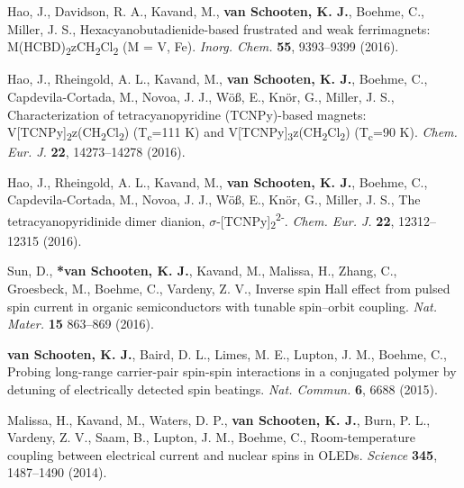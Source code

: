 \documentclass[11pt,letterpaper]{article}
\begin{document}
\begin{bibenum}
	\item Hao, J., Davidson, R. A., Kavand, M., \textbf{van Schooten, K. J.}, Boehme, C., Miller, J. S., Hexacyanobutadienide-based frustrated and weak ferrimagnets: M(HCBD)\textsubscript{2}\textbullet zCH\textsubscript{2}Cl\textsubscript{2} (M = V, Fe). \textit{Inorg. Chem.} \textbf{55}, 9393--9399 (2016). 

	\item Hao, J., Rheingold, A. L., Kavand, M., \textbf{van Schooten, K. J.}, Boehme, C., Capdevila-Cortada, M., Novoa, J. J., W\"o\ss{}, E., Kn\"or, G., Miller, J. S., Characterization of tetracyanopyridine (TCNPy)-based magnets: V[TCNPy]\textsubscript{2}\textbullet z(CH\textsubscript{2}Cl\textsubscript{2}) (T\textsubscript{c}=111 K) and V[TCNPy]\textsubscript{3}\textbullet z(CH\textsubscript{2}Cl\textsubscript{2}) (T\textsubscript{c}=90 K). \textit{Chem. Eur. J.} \textbf{22}, 14273--14278 (2016). 

	\item Hao, J., Rheingold, A. L., Kavand, M., \textbf{van Schooten, K. J.}, Boehme, C., Capdevila-Cortada, M., Novoa, J. J., W\"o\ss{}, E., Kn\"or, G., Miller, J. S., The tetracyanopyridinide dimer dianion, $\sigma$-[TCNPy]\textsubscript{2}\textsuperscript{2-}. \textit{Chem. Eur. J.} \textbf{22}, 12312--12315 (2016). 

	\item *Sun, D., \textbf{*van Schooten, K. J.}, Kavand, M., Malissa, H., Zhang, C., Groesbeck, M., Boehme, C., Vardeny, Z. V., Inverse spin Hall effect from pulsed spin current in organic semiconductors with tunable spin–orbit coupling. \textit{Nat. Mater.} \textbf{15} 863--869 (2016).  

	\item \textbf{van Schooten, K. J.}, Baird, D. L., Limes, M. E., Lupton, J. M., Boehme, C., Probing long-range carrier-pair spin-spin interactions in a conjugated polymer by detuning of electrically detected spin beatings. \textit{Nat. Commun.} \textbf{6}, 6688 (2015).  

	\item Malissa, H., Kavand, M., Waters, D. P., \textbf{van Schooten, K. J.}, Burn, P. L., Vardeny, Z. V., Saam, B., Lupton, J. M., Boehme, C., Room-temperature coupling between electrical current and nuclear spins in OLEDs. \textit{Science} \textbf{345}, 1487--1490 (2014).  


\end{bibenum}
\end{document}
